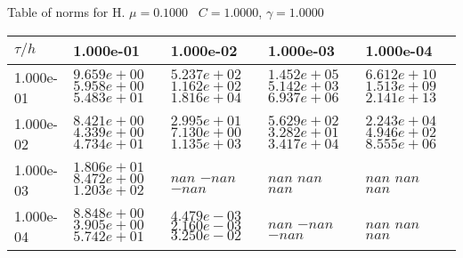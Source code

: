 \begin{center}
Table of norms for H. $\mu = 0.1000$ \, $C = 1.0000$, $\gamma = 1.0000$
  
\begin{tabular}{|p{1in}|p{1in}|p{1in}|p{1in}|p{1in}|} \hline
$\tau / h$ &1.000e-01 &1.000e-02 &1.000e-03 &1.000e-04 \\ \hline 
1.000e-01 & $9.659e+00$  $5.958e+00$  $5.483e+01$  & $5.237e+02$  $1.162e+02$  $1.816e+04$  & $1.452e+05$  $5.142e+03$  $6.937e+06$  & $6.612e+10$  $1.513e+09$  $2.141e+13$  \\ \hline 
1.000e-02 & $8.421e+00$  $4.339e+00$  $4.734e+01$  & $2.995e+01$  $7.130e+00$  $1.135e+03$  & $5.629e+02$  $3.282e+01$  $3.417e+04$  & $2.243e+04$  $4.946e+02$  $8.555e+06$  \\ \hline 
1.000e-03 & $1.806e+01$  $8.472e+00$  $1.203e+02$  & $nan$  $-nan$  $-nan$  & $nan$  $nan$  $nan$  & $nan$  $nan$  $nan$  \\ \hline 
1.000e-04 & $8.848e+00$  $3.905e+00$  $5.742e+01$  & $4.479e-03$  $2.160e-03$  $3.250e-02$  & $nan$  $-nan$  $-nan$  & $nan$  $nan$  $nan$  \\ \hline 

\end{tabular}\\[20pt]
\end{center}
